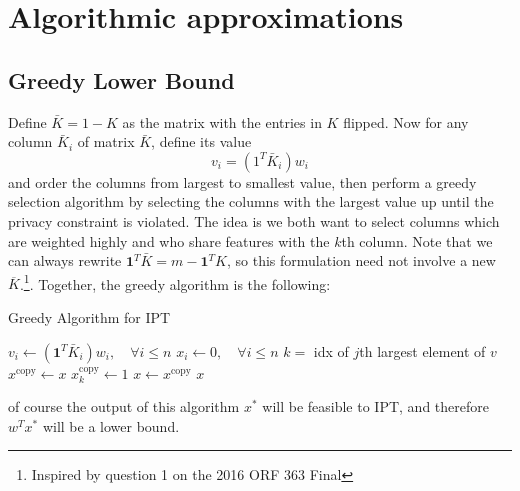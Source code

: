 \documentclass[12pt]{article}
\begin{document}
\section{Algorithmic approximations}
\subsection{Greedy Lower Bound}
    Define $\bar{K} = 1 - K$ as the matrix with the entries in $K$ flipped. Now for any column $\bar{K}_i$ of matrix $\bar{K}$, define its value \[v_i = (1^T \bar{K}_i) w_i\] and order the columns from largest to smallest value, then perform a greedy selection algorithm by selecting the columns with the largest value up until the privacy constraint is violated. The idea is we both want to select columns which are weighted highly and who share features with the $k$th column.  Note that we can always rewrite $\mathbf{1}^T\bar{K} = m - \mathbf{1}^TK$, so this formulation need not involve a new $\overline{K}$.\footnote{Inspired by question 1 on the 2016 ORF 363 Final}. Together, the greedy algorithm is the following:
    \begin{algorithm}
    \caption{Greedy Algorithm for \gls{IPT}}\label{alg:greedy}
    \begin{algorithmic}
        \State $v_i \gets (\mathbf{1}^T\bar{K}_i)w_i, \quad \forall i\leq n$
        \State $x_i \gets 0, \quad \forall i\leq n$
        \State $k = $ idx of $j$th largest element of $v$
        \State $x^{\text{copy}} \gets x$
        \State $x^{\text{copy}}_k \gets 1$
            \State $x \gets x^{\text{copy}}$
        \EndIf
        \EndFor
        \Return $x$
        \end{algorithmic}
    \end{algorithm}
of course the output of this algorithm $x^*$ will be feasible to \gls{IPT}, and therefore $w^Tx^*$ will be a lower bound.
\end{document}

